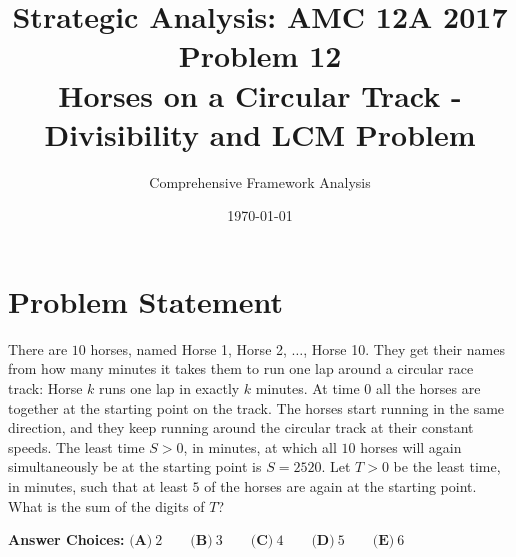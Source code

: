 \documentclass[]{article}
\title{\textbf{Strategic Analysis: AMC 12A 2017 Problem 12}\\
\large{Horses on a Circular Track - Divisibility and LCM Problem}}
\author{Comprehensive Framework Analysis}
\date{\today}
\begin{document}
\maketitle

\section*{Problem Statement}
There are $10$ horses, named Horse 1, Horse 2, $\ldots$, Horse 10. They get their names from how many minutes it takes them to run one lap around a circular race track: Horse $k$ runs one lap in exactly $k$ minutes. At time 0 all the horses are together at the starting point on the track. The horses start running in the same direction, and they keep running around the circular track at their constant speeds. The least time $S > 0$, in minutes, at which all $10$ horses will again simultaneously be at the starting point is $S = 2520$. Let $T>0$ be the least time, in minutes, such that at least $5$ of the horses are again at the starting point. What is the sum of the digits of $T$?

\textbf{Answer Choices:}
$\textbf{(A)}\ 2\qquad\textbf{(B)}\ 3\qquad\textbf{(C)}\ 4\qquad\textbf{(D)}\ 5\qquad\textbf{(E)}\ 6$

\vspace{1em}
\end{document}
